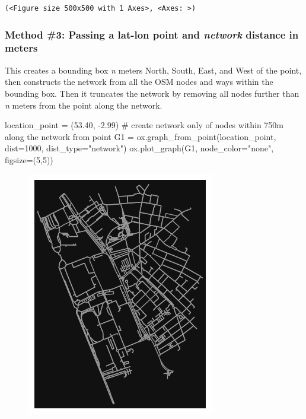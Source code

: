 \documentclass[
  letterpaper,
  DIV=11,
  numbers=noendperiod]{scrreprt}
\newenvironment{Shaded}{\begin{snugshade}}{\end{snugshade}}
\newcommand{\CommentTok}[1]{\textcolor[rgb]{0.37,0.37,0.37}{#1}}
\newcommand{\DecValTok}[1]{\textcolor[rgb]{0.68,0.00,0.00}{#1}}
\newcommand{\FloatTok}[1]{\textcolor[rgb]{0.68,0.00,0.00}{#1}}
\newcommand{\NormalTok}[1]{\textcolor[rgb]{0.00,0.23,0.31}{#1}}
\newcommand{\OperatorTok}[1]{\textcolor[rgb]{0.37,0.37,0.37}{#1}}
\newcommand{\StringTok}[1]{\textcolor[rgb]{0.13,0.47,0.30}{#1}}
\begin{document}
\begin{verbatim}
(<Figure size 500x500 with 1 Axes>, <Axes: >)
\end{verbatim}

\hypertarget{method-3-passing-a-lat-lon-point-and-network-distance-in-meters}{%
\subsubsection{\texorpdfstring{Method \#3: Passing a lat-lon point and
\emph{network} distance in
meters}{Method \#3: Passing a lat-lon point and network distance in meters}}\label{method-3-passing-a-lat-lon-point-and-network-distance-in-meters}}

This creates a bounding box \emph{n} meters North, South, East, and West
of the point, then constructs the network from all the OSM nodes and
ways within the bounding box. Then it truncates the network by removing
all nodes further than \emph{n} meters from the point along the network.

\begin{Shaded}
\begin{Highlighting}[]
\NormalTok{location\_point }\OperatorTok{=}\NormalTok{ (}\FloatTok{53.40}\NormalTok{, }\OperatorTok{{-}}\FloatTok{2.99}\NormalTok{)}
\CommentTok{\# create network only of nodes within 750m along the network from point}
\NormalTok{G1 }\OperatorTok{=}\NormalTok{ ox.graph\_from\_point(location\_point, dist}\OperatorTok{=}\DecValTok{1000}\NormalTok{, dist\_type}\OperatorTok{=}\StringTok{"network"}\NormalTok{)}
\NormalTok{ox.plot\_graph(G1, node\_color}\OperatorTok{=}\StringTok{"none"}\NormalTok{, figsize}\OperatorTok{=}\NormalTok{(}\DecValTok{5}\NormalTok{,}\DecValTok{5}\NormalTok{))}
\end{Highlighting}
\end{Shaded}

\begin{figure}[H]

{\centering \includegraphics{labs/w07_OSM_files/figure-pdf/cell-8-output-1.png}

}

\end{figure}
\end{document}
